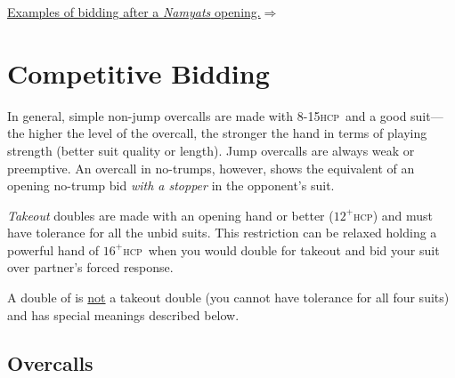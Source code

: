\documentclass[a4paper,article,oneside]{memoir}
\newcommand{\hcp}{\textsc{hcp}}
\begin{document}
\hyperlink{namyats}{Examples of bidding after a \emph{Namyats}
  opening.$\Rightarrow$}

\pagebreak

\section{Competitive Bidding}

In general, simple non-jump overcalls are made with 8-15\hcp\ and a
good suit---the higher the level of the overcall, the stronger the
hand in terms of playing strength (better suit quality or length).
Jump overcalls are always weak or preemptive. An overcall in
no-trumps, however, shows the equivalent of an opening no-trump bid
\emph{with a stopper} in the opponent's suit.

\emph{Takeout} doubles are made with an opening hand or better
($12^+$\hcp) and must have tolerance for all the unbid suits. This
restriction can be relaxed holding a powerful hand of $16^+$\hcp\ when
you would double for takeout and bid your suit over partner's forced
response.

A double of  is \underline{not} a takeout double (you cannot
have tolerance for all four suits) and has special meanings described
below.

\subsection{Overcalls}
\end{document}
